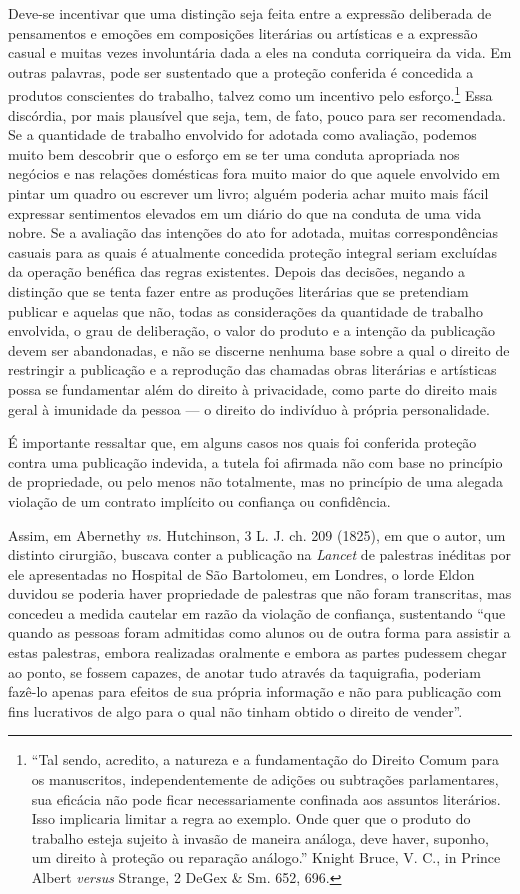 Deve-se incentivar que uma distinção seja feita entre a expressão
deliberada de pensamentos e emoções em composições literárias ou
artísticas e a expressão casual e muitas vezes involuntária dada a eles
na conduta corriqueira da vida. Em outras palavras, pode ser sustentado
que a proteção conferida é concedida a produtos conscientes do trabalho,
talvez como um incentivo pelo esforço.\footnote{``Tal sendo, acredito, a
  natureza e a fundamentação do Direito Comum para os manuscritos,
  independentemente de adições ou subtrações parlamentares, sua eficácia
  não pode ficar necessariamente confinada aos assuntos literários. Isso
  implicaria limitar a regra ao exemplo. Onde quer que o produto do
  trabalho esteja sujeito à invasão de maneira análoga, deve haver,
  suponho, um direito à proteção ou reparação análogo.'' Knight Bruce,
  V. C., in Prince Albert \emph{versus} Strange, 2 DeGex \& Sm. 652,
  696.} Essa discórdia, por mais plausível que seja, tem, de fato, pouco
para ser recomendada. Se a quantidade de trabalho envolvido for adotada
como avaliação, podemos muito bem descobrir que o esforço em se ter uma
conduta apropriada nos negócios e nas relações domésticas fora muito
maior do que aquele envolvido em pintar um quadro ou escrever um livro;
alguém poderia achar muito mais fácil expressar sentimentos elevados em
um diário do que na conduta de uma vida nobre. Se a avaliação das
intenções do ato for adotada, muitas correspondências casuais para as
quais é atualmente concedida proteção integral seriam excluídas da
operação benéfica das regras existentes. Depois das decisões, negando a
distinção que se tenta fazer entre as produções literárias que se
pretendiam publicar e aquelas que não, todas as considerações da
quantidade de trabalho envolvida, o grau de deliberação, o valor do
produto e a intenção da publicação devem ser abandonadas, e não se
discerne nenhuma base sobre a qual o direito de restringir a publicação
e a reprodução das chamadas obras literárias e artísticas possa se
fundamentar além do direito à privacidade, como parte do direito mais
geral à imunidade da pessoa --- o direito do indivíduo à própria
personalidade.

É importante ressaltar que, em alguns casos nos quais foi conferida
proteção contra uma publicação indevida, a tutela foi afirmada não com
base no princípio de propriedade, ou pelo menos não totalmente, mas no
princípio de uma alegada violação de um contrato implícito ou confiança
ou confidência.

Assim, em Abernethy \emph{vs.} Hutchinson, 3 L. J. ch. 209 (1825), em
que o autor, um distinto cirurgião, buscava conter a publicação na
\emph{Lancet} de palestras inéditas por ele apresentadas no Hospital de
São Bartolomeu, em Londres, o lorde Eldon duvidou se poderia haver
propriedade de palestras que não foram transcritas, mas concedeu a
medida cautelar em razão da violação de confiança, sustentando ``que
quando as pessoas foram admitidas como alunos ou de outra forma para
assistir a estas palestras, embora realizadas oralmente e embora as
partes pudessem chegar ao ponto, se fossem capazes, de anotar tudo
através da taquigrafia, poderiam fazê-lo apenas para efeitos de sua
própria informação e não para publicação com fins lucrativos de algo
para o qual não tinham obtido o direito de vender''.

